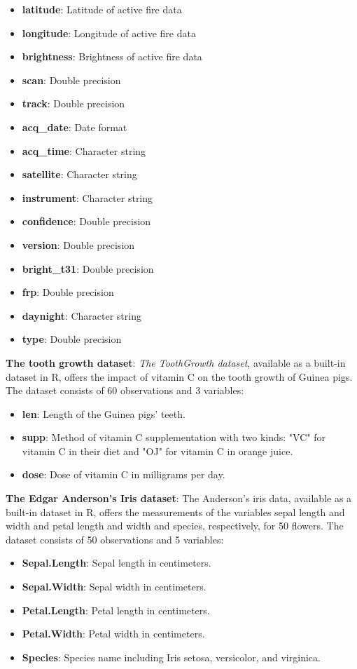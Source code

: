\documentclass{article}\usepackage[]{graphicx}\usepackage[]{xcolor}
\begin{document}
\begin{itemize}
    \item \textbf{latitude}: Latitude of active fire data
    \item \textbf{longitude}: Longitude of active fire data
    \item \textbf{brightness}: Brightness of active fire data
    \item \textbf{scan}: Double precision
    \item \textbf{track}: Double precision
    \item \textbf{acq\_date}: Date format
    \item \textbf{acq\_time}: Character string
    \item \textbf{satellite}: Character string
    \item \textbf{instrument}: Character string
    \item \textbf{confidence}: Double precision
    \item \textbf{version}: Double precision
    \item \textbf{bright\_t31}: Double precision
    \item \textbf{frp}: Double precision
    \item \textbf{daynight}: Character string
    \item \textbf{type}: Double precision
\end{itemize}
\noindent
\textbf{The tooth growth dataset}: \textit{The ToothGrowth dataset}, available as a built-in dataset in R, offers the impact of vitamin C on the tooth growth of Guinea pigs. The dataset consists of 60 observations and 3 variables:
\begin{itemize}
    \item \textbf{len}: Length of the Guinea pigs' teeth.
    \item \textbf{supp}: Method of vitamin C supplementation with two kinds: "VC" for vitamin C in their diet and "OJ" for vitamin C in orange juice.
    \item \textbf{dose}: Dose of vitamin C in milligrams per day.
\end{itemize}
\noindent
\textbf{The Edgar Anderson's Iris dataset}: The Anderson's iris data, available as a built-in dataset in R, offers the measurements of the variables sepal length and width and petal length and width and species, respectively, for 50 flowers. The dataset consists of 50 observations and 5 variables:
\begin{itemize}
    \item \textbf{Sepal.Length}: Sepal length in centimeters.
    \item \textbf{Sepal.Width}: Sepal width in centimeters.
    \item \textbf{Petal.Length}: Petal length in centimeters.
    \item \textbf{Petal.Width}: Petal width in centimeters.
    \item \textbf{Species}: Species name including Iris setosa, versicolor, and virginica.
\end{itemize}
\end{document}
